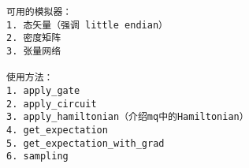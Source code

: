 \begin{lstlisting}
可用的模拟器：
1. 态矢量（强调 little endian）
2. 密度矩阵
3. 张量网络

使用方法：
1. apply_gate
2. apply_circuit
3. apply_hamiltonian（介绍mq中的Hamiltonian）
4. get_expectation
5. get_expectation_with_grad
6. sampling
\end{lstlisting}